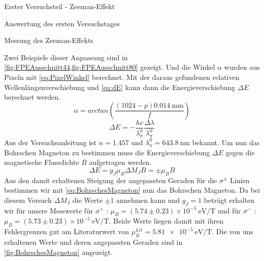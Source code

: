 \documentclass[pdftex, a4paper,11pt, twoside, ngerman]{report}
\begin{document}
\begin{chapter}{Erster Versuchsteil - Zeeman-Effekt}
\begin{section}{Auswertung des ersten Versuchstages}
\begin{subsection}{Messung des Zeeman-Effekts}
\begin{figure}[b!]
\begin{minipage}{0.48\textwidth}
          \end{minipage}
        \end{figure}
        Zwei Beispiele dieser Anpassung sind in
        \cref{fig:FPEAusschnitt44,fig:FPEAusschnitt80} gezeigt. Und die Winkel
        $\alpha$ wurden aus Pixeln mit \cref{eq:PixelWinkel} berechnet. Mit der
        daraus gefundenen relativen Wellenlängenverschiebung und \cref{eq:dE}
        kann dann die Energieverschiebung $\Delta E$ berechnet werden.
        \begin{equation}
          \label{eq:PixelWinkel}
          \alpha=arctan\left(\frac{(1024-p)\SI{0.014}{\milli\meter}}{f}\right)
        \end{equation}
        \begin{equation}
          \label{eq:dE}
          \Delta E = -\frac{hc}{\lambda_{\pi}^{0}}
          \frac{\Delta\lambda}{\lambda_{\pi}^{0}}
        \end{equation}
        Aus der Versuchsanleitung ist $n=1.457$ und
        $\lambda_{\pi}^{0}=\SI{643.8}{\nano\meter}$ bekannt. Um nun das
        Bohrschen Magneton zu bestimmen muss die Energieverschiebung $\Delta E$
        gegen die magnetische Flussdichte $B$ aufgetragen werden. 
        \begin{equation}
          \label{eq:BohrschesMagneton}
          \Delta E = g_{J}\mu_{B}\Delta M_{J}B = \pm\mu_{B}B
        \end{equation}
        Aus den damit erhaltenen Steigung der angepassten Geraden für die
        $\sigma^{\pm}$ Linien bestimmen wir mit \cref{eq:BohrschesMagneton} nun
        das Bohrschen Magneton. Da bei diesem Versuch $\Delta M_{J}$ die Werte
        $\pm1$ annehmen kann und $g_{J}=1$ beträgt erhalten wir für unsere
        Messwerte für $\sigma^{+}$ : $\mu_{B}=(5.74\pm0.23) \times10^{-5}
        \SI{}{\electronvolt\per\tesla}$ und für $\sigma^{-}$ : $\mu_{B}=
        (5.73\pm0.23) \times10^{-5}\SI{}{\electronvolt\per\tesla}$.
        Beide Werte liegen damit mit ihren Fehlergrenzen gut am Literaturwert
        von $\mu_{B}^{Lit}=\SI{5.81e-5}{\electronvolt\per\tesla}$.
        Die von uns erhaltenen Werte und deren angepassten Geraden sind in
        \cref{fig:BohrschesMagneton} angezeigt.
        \begin{figure}[ht]
          \centering

\end{figure}
\end{subsection}
\end{section}
\end{chapter}
\end{document}
